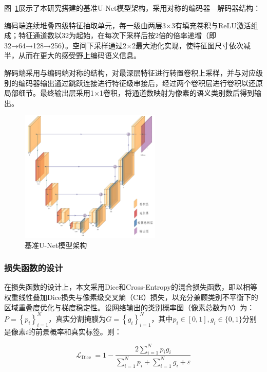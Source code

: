 图~\ref{fig:unet_ushape}展示了本研究搭建的基准U-Net模型架构，采用对称的编码器—解码器结构：

编码端连续堆叠四级特征抽取单元，每一级由两层3×3有填充卷积与ReLU激活组成；特征通道数以32为起始，在每次下采样后按2倍的倍率递增（即32→64→128→256）。空间下采样通过2×2最大池化实现，使特征图尺寸依次减半，从而在更大的感受野上编码语义信息。

解码端采用与编码端对称的结构，对最深层特征进行转置卷积上采样，并与对应级别的编码器输出通过跳跃连接进行特征级串接后，经过两个卷积层进行卷积以还原局部细节。最终输出层采用1×1卷积，将通道数映射为像素的语义类别数后得到输出。

\begin{figure}[h]
    \centering
    \includegraphics[width=0.6\textwidth]{fig/Unet_ushape.png}
    \caption{基准U-Net模型架构}
    \label{fig:unet_ushape}
\end{figure}

\subsubsection{损失函数的设计}

在损失函数的设计上，本文采用Dice和Cross-Entropy的混合损失函数，即以相等权重线性叠加Dice损失与像素级交叉熵（CE）损失，以充分兼顾类别不平衡下的区域重叠度优化与梯度稳定性。设网络输出的类别概率图（像素总数为$N$）为：$ P=\left\{p_{i}\right\}_{i=1}^{N} $，真实分割掩膜为$ G=\left\{g_{i}\right\}_{i=1}^{N} $，其中$ p_{i} \in[0,1], g_{i} \in\{0,1\}$分别是像素$i$的前景概率和真实标签。则：

\begin{equation}
    \mathcal{L}_{\text {Dice }}=1-\frac{2 \sum_{i=1}^{N} p_{i} g_{i}}{\sum_{i=1}^{N} p_{i}+\sum_{i=1}^{N} g_{i}+\varepsilon}
\end{equation}

